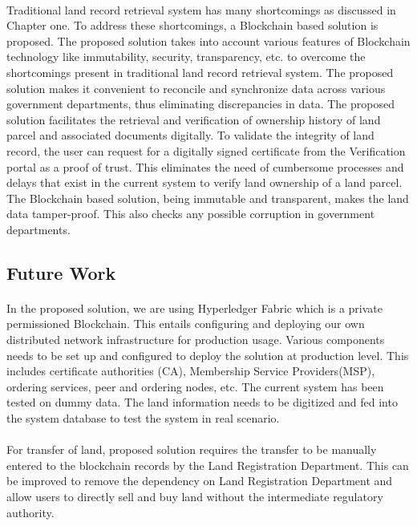 \documentclass{article}
\begin{document}
            \paragraph{}
            Traditional land record retrieval system has many shortcomings as discussed in Chapter one. To address these shortcomings, a Blockchain based solution is proposed. The proposed solution takes into account various features of Blockchain technology like immutability, security, transparency, etc. to overcome the shortcomings present in traditional land record retrieval system. The proposed solution makes it convenient to reconcile and synchronize data across various government departments, thus eliminating discrepancies in data. The proposed solution facilitates the retrieval and verification of ownership history of land parcel and associated documents digitally. To validate the integrity of land record, the user can request for a digitally signed certificate from the Verification portal as a proof of trust. This eliminates the need of cumbersome processes and delays that exist in the current system to verify land ownership of a land parcel. The Blockchain based solution, being immutable and transparent, makes the land data tamper-proof. This also checks any possible corruption in government departments.
        
        \subsection{Future Work}
            \paragraph{}
            In the proposed solution, we are using Hyperledger Fabric \cite{fabric} which is a private permissioned Blockchain. This entails configuring and deploying our own distributed network infrastructure for production usage. Various components needs to be set up and configured to deploy the solution at production level. This includes certificate authorities (CA), Membership Service Providers(MSP), ordering services, peer and ordering nodes, etc. The current system has been tested on dummy data. The land information needs to be digitized and fed into the system database to test the system in real scenario. 
            
            \paragraph{}
            For transfer of land, proposed solution requires the transfer to be manually entered to the blockchain records by the Land Registration Department. This can be improved to remove the dependency on Land Registration Department and allow users to directly sell and buy land without the intermediate regulatory authority.
\end{document}
